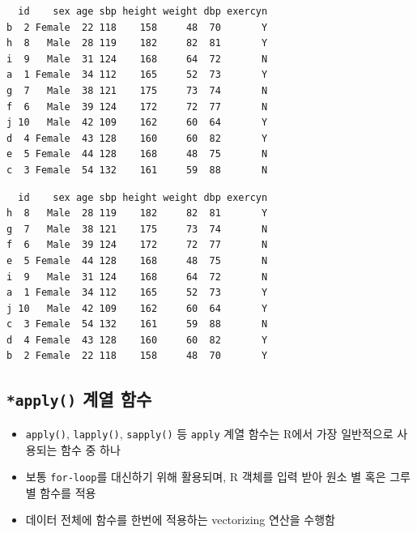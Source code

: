 \documentclass[
  11pt,
]{krantz}
\newenvironment{Shaded}{\begin{snugshade}}{\end{snugshade}}
\newcommand{\CommentTok}[1]{\textcolor[rgb]{0.37,0.37,0.37}{\textit{#1}}}
\newcommand{\DataTypeTok}[1]{\textcolor[rgb]{0.27,0.27,0.27}{#1}}
\newcommand{\KeywordTok}[1]{\textcolor[rgb]{0.27,0.27,0.27}{\textbf{#1}}}
\newcommand{\NormalTok}[1]{#1}
\newcommand{\OperatorTok}[1]{\textcolor[rgb]{0.43,0.43,0.43}{\textbf{#1}}}
\providecommand{\tightlist}{%
  \setlength{\itemsep}{0pt}\setlength{\parskip}{0pt}}
\begin{document}
\begin{verbatim}
  id    sex age sbp height weight dbp exercyn
b  2 Female  22 118    158     48  70       Y
h  8   Male  28 119    182     82  81       Y
i  9   Male  31 124    168     64  72       N
a  1 Female  34 112    165     52  73       Y
g  7   Male  38 121    175     73  74       N
f  6   Male  39 124    172     72  77       N
j 10   Male  42 109    162     60  64       Y
d  4 Female  43 128    160     60  82       Y
e  5 Female  44 128    168     48  75       N
c  3 Female  54 132    161     59  88       N
\end{verbatim}

\begin{Shaded}
\end{Shaded}

\begin{verbatim}
  id    sex age sbp height weight dbp exercyn
h  8   Male  28 119    182     82  81       Y
g  7   Male  38 121    175     73  74       N
f  6   Male  39 124    172     72  77       N
e  5 Female  44 128    168     48  75       N
i  9   Male  31 124    168     64  72       N
a  1 Female  34 112    165     52  73       Y
j 10   Male  42 109    162     60  64       Y
c  3 Female  54 132    161     59  88       N
d  4 Female  43 128    160     60  82       Y
b  2 Female  22 118    158     48  70       Y
\end{verbatim}

\normalsize

\hypertarget{apply-related-fun}{%
\subsection{\texorpdfstring{\texttt{*apply()} 계열 함수}{*apply() 계열 함수}}\label{apply-related-fun}}

\begin{itemize}
\tightlist
\item
  \texttt{apply()}, \texttt{lapply()}, \texttt{sapply()} 등 \texttt{apply} 계열 함수는 R에서 가장 일반적으로 사용되는 함수 중 하나
\item
  보통 \texttt{for-loop}를 대신하기 위해 활용되며, R 객체를 입력 받아 원소 별 혹은 그루 별 함수를 적용
\item
  데이터 전체에 함수를 한번에 적용하는 vectorizing 연산을 수행함
\end{itemize}
\end{document}
